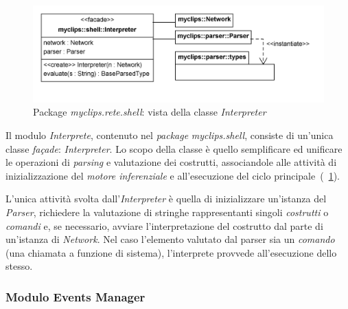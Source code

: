 \begin{figure}[h]
\centering
\includegraphics[width=1\textwidth]{Immagini/Capitolo3/Classi/myclips_shell_Interpreter.png}
\caption{Package \emph{myclips.rete.shell}: vista della classe \emph{Interpreter}}\label{fig:class-myclips-shell-interpreter}
\end{figure}

Il modulo \emph{Interprete}, contenuto nel \emph{package} \emph{myclips.shell}, consiste di un'unica classe \emph{fa\c{c}ade}: \emph{Interpreter}. Lo scopo della classe è quello semplificare ed unificare le operazioni di \emph{parsing} e valutazione dei costrutti, associandole alle attività di inizializzazione del \emph{motore inferenziale} e all'esecuzione del ciclo principale~(\figurename~\ref{fig:class-myclips-shell-interpreter}).

L'unica attività svolta dall'\emph{Interpreter} è quella di inizializzare un'istanza del \emph{Parser}, richiedere la valutazione di stringhe rappresentanti singoli \emph{costrutti} o \emph{comandi} e, se necessario, avviare l'interpretazione del costrutto dal parte di un'istanza di \emph{Network}. Nel caso l'elemento valutato dal parser sia un \emph{comando} (una chiamata a funzione di sistema), l'interprete provvede all'esecuzione dello stesso.

\subsubsection{Modulo Events Manager}

